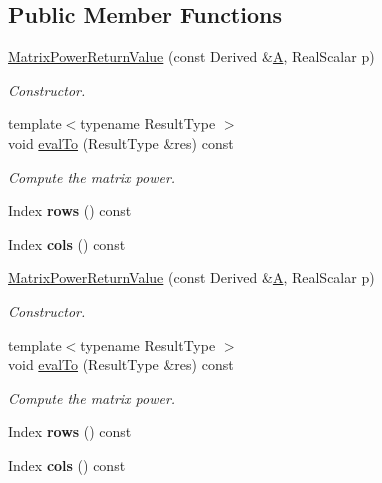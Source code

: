 \subsection*{Public Member Functions}
\begin{DoxyCompactItemize}
\item 
\hyperlink{class_eigen_1_1_matrix_power_return_value_a3067e09b352f967a23bb2a9c50afee88}{Matrix\+Power\+Return\+Value} (const Derived \&\hyperlink{group___core___module_class_eigen_1_1_matrix}{A}, Real\+Scalar p)
\begin{DoxyCompactList}\small\item\em Constructor. \end{DoxyCompactList}\item 
{\footnotesize template$<$typename Result\+Type $>$ }\\void \hyperlink{class_eigen_1_1_matrix_power_return_value_acdef58da9a4bcd2ec70260e73ce31973}{eval\+To} (Result\+Type \&res) const
\begin{DoxyCompactList}\small\item\em Compute the matrix power. \end{DoxyCompactList}\item 
\mbox{\label{class_eigen_1_1_matrix_power_return_value_a91d8d3744aa95cdce4830c6baa1ccf06}} 
Index {\bfseries rows} () const
\item 
\mbox{\label{class_eigen_1_1_matrix_power_return_value_a1feb1c3c50dc939a3e720824b4501abc}} 
Index {\bfseries cols} () const
\item 
\hyperlink{class_eigen_1_1_matrix_power_return_value_a3067e09b352f967a23bb2a9c50afee88}{Matrix\+Power\+Return\+Value} (const Derived \&\hyperlink{group___core___module_class_eigen_1_1_matrix}{A}, Real\+Scalar p)
\begin{DoxyCompactList}\small\item\em Constructor. \end{DoxyCompactList}\item 
{\footnotesize template$<$typename Result\+Type $>$ }\\void \hyperlink{class_eigen_1_1_matrix_power_return_value_acdef58da9a4bcd2ec70260e73ce31973}{eval\+To} (Result\+Type \&res) const
\begin{DoxyCompactList}\small\item\em Compute the matrix power. \end{DoxyCompactList}\item 
\mbox{\label{class_eigen_1_1_matrix_power_return_value_a91d8d3744aa95cdce4830c6baa1ccf06}} 
Index {\bfseries rows} () const
\item 
\mbox{\label{class_eigen_1_1_matrix_power_return_value_a1feb1c3c50dc939a3e720824b4501abc}} 
Index {\bfseries cols} () const
\end{DoxyCompactItemize}


